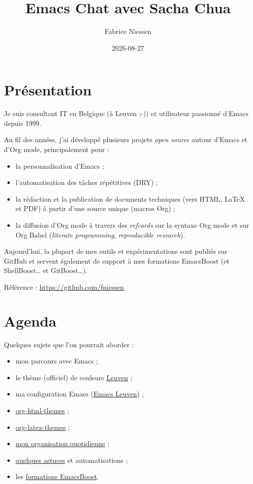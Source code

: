 \documentclass{mcreport}
\author{Fabrice Niessen}
\date{2026-08-27}
\title{Emacs Chat avec Sacha Chua}
\begin{document}
\maketitle
\setcounter{tocdepth}{2}
\tableofcontents

\chapter{Présentation}
\label{sec:org9615709}

Je suis consultant IT en Belgique (à Leuven ;-)) et utilisateur passionné
d'Emacs depuis 1999.

Au fil des années, j'ai développé plusieurs projets \emph{open source} autour d'Emacs
et d'Org mode, principalement pour :

\begin{itemize}
\item la personnalisation d'Emacs ;
\item l'automatisation des tâches répétitives (DRY) ;
\item la rédaction et la publication de documents techniques (vers HTML, \LaTeX{} et
PDF) à partir d'une source unique (macros Org) ;
\item la diffusion d'Org mode à travers des \emph{refcards} sur la syntaxe Org mode et sur
Org Babel (\emph{literate programming}, \emph{reproducible research}).
\end{itemize}

\begin{tip}
Aujourd'hui, la plupart de mes outils et expérimentations sont publiés sur
GitHub et servent également de support à mes formations EmacsBoost (et
ShellBoost\ldots{} et GitBoost\ldots{}).
\end{tip}

Référence : \url{https://github.com/fniessen}
\chapter{Agenda}
\label{sec:org3830d82}

Quelques sujets que l'on pourrait aborder :

\begin{itemize}
\item mon parcours avec Emacs ;
\item le thème (officiel) de couleurs \hyperref[sec:org40203cc]{Leuven} ;
\item ma configuration Emacs (\og \hyperref[sec:orgb911a05]{Emacs Leuven}\fg{}) ;
\item \hyperref[sec:org0f0c2e0]{org-html-themes} ;
\item \hyperref[sec:org4536a50]{org-latex-themes} ;
\item \hyperref[sec:orgbde9319]{mon organisation quotidienne} ;
\item \hyperref[sec:orgdda8814]{quelques astuces} et automatisations ;
\item les \hyperref[sec:orgb8405ee]{formations EmacsBoost}.
\end{itemize}
\end{document}
